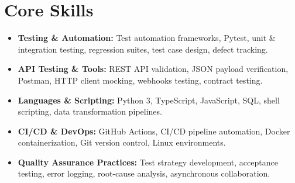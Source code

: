 \documentclass[a4paper,10pt]{article}
\begin{document}
\section{Core Skills}
\begin{itemize}
  \item \textbf{Testing \& Automation:} Test automation frameworks, Pytest, unit \& integration testing, regression suites, test case design, defect tracking.
  \item \textbf{API Testing \& Tools:} REST API validation, JSON payload verification, Postman, HTTP client mocking, webhooks testing, contract testing.
  \item \textbf{Languages \& Scripting:} Python 3, TypeScript, JavaScript, SQL, shell scripting, data transformation pipelines.
  \item \textbf{CI/CD \& DevOps:} GitHub Actions, CI/CD pipeline automation, Docker containerization, Git version control, Linux environments.
  \item \textbf{Quality Assurance Practices:} Test strategy development, acceptance testing, error logging, root-cause analysis, asynchronous collaboration.
\end{itemize}
\end{document}
